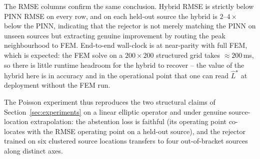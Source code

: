 The RMSE columns confirm the same conclusion. Hybrid RMSE is
strictly below PINN RMSE on every row, and on each held-out source
the hybrid is $2\text{--}4\times$ below the PINN, indicating that
the rejector is not merely matching the PINN on unseen sources but
extracting genuine improvement by routing the peak neighbourhood to
FEM. End-to-end wall-clock is at near-parity with full FEM, which
is expected: the FEM solve on a $200\times200$ structured grid
takes $\approx 200$\,ms, so there is little runtime headroom for
the hybrid to recover -- the value of the hybrid here is in
accuracy and in the operational point that one can read
$\widehat{L}^\star$ at deployment without the FEM run.



The Poisson experiment thus reproduces the two structural claims
of Section~\ref{sec:experiments} on a linear elliptic operator and
under genuine source-location extrapolation: the abstention loss is
faithful (its operating point co-locates with the RMSE operating
point on a held-out source), and the rejector trained on six
clustered source locations transfers to four out-of-bracket sources
along distinct axes.
